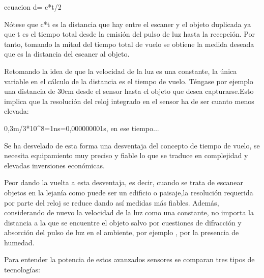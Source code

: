 ecuacion d= c*t/2

Nótese que c*t es la distancia que hay entre el escaner y el objeto duplicada ya que t es el tiempo total desde la emisión del pulso de luz hasta la recepción. Por tanto, tomando la mitad del tiempo total de vuelo se obtiene la medida deseada que es la distancia del escaner al objeto.

Retomando la idea de que la velocidad de la luz es una constante, la única variable en el cálculo de la distancia es el tiempo de vuelo. Téngase por ejemplo una distancia de 30cm desde el sensor hasta el objeto que desea capturarse.Esto implica que la resolución del reloj integrado en el sensor ha de ser cuanto menos elevada:

0,3m/3*10^8=1ns=0,000000001s, en ese tiempo...

Se ha desvelado de esta forma una desventaja del concepto de tiempo de vuelo, se necesita equipamiento muy preciso y fiable lo que se traduce en complejidad y elevadas inversiones económicas.

Peor dando la vuelta a esta desventaja, es decir, cuando se trata de escanear objetos en la lejanía como puede ser un edificio o paisaje,la resolución requerida por parte del reloj se reduce dando así medidas más fiables. Además, considerando de nuevo la velocidad de la luz como una constante, no importa la distancia a la que se encuentre el objeto salvo por cuestiones de difracción y absorción del pulso de luz en el ambiente, por ejemplo , por la presencia de humedad.






Para entender la potencia de estos avanzados sensores se comparan tres tipos de tecnologías: 



